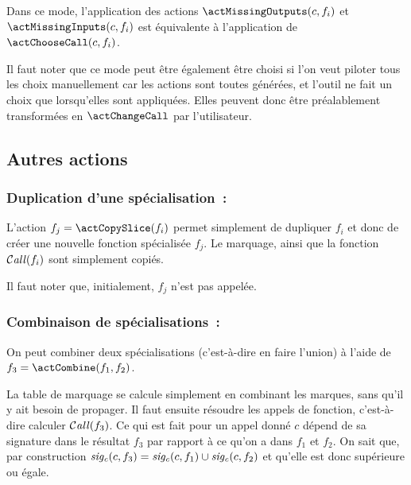 Dans ce mode, l'application des actions $\actMissingOutputs(c, f_i)$ et 
$\actMissingInputs(c, f_i)$ est équivalente à l'application
de $\actChooseCall(c, f_i)$.
\bb

Il faut noter que ce mode peut être également être choisi si l'on veut piloter
tous les choix manuellement car les actions sont toutes générées, et l'outil ne
fait un choix que lorsqu'elles sont appliquées. Elles peuvent donc être
préalablement transformées en $\actChangeCall$ par l'utilisateur.


\subsection{Autres actions}

\subsubsection{Duplication d'une spécialisation~: \actCopySlice}

L'action $f_j = \actCopySlice(f_i)$ permet simplement de dupliquer $f_i$
et donc de créer une nouvelle fonction spécialisée $f_j$.
Le marquage, ainsi que la fonction $\operatorname{\mathcal{C\mathit{all}}}(f_i)$ sont simplement copiés.

Il faut noter que, initialement, $f_j$ n'est pas appelée.

\subsubsection{Combinaison de spécialisations~: \actCombine}

On peut combiner deux spécialisations (c'est-à-dire en faire l'union) 
à l'aide de $f_3 = \actCombine(f_1, f_2)$.\bb

La table de marquage se
calcule simplement en combinant les marques, sans qu'il y ait besoin de
propager.  Il faut ensuite résoudre les appels de fonction, c'est-à-dire
calculer $\operatorname{\mathcal{C\mathit{all}}}(f_3)$.  Ce qui est fait
pour un appel donné $c$ dépend de sa signature dans le résultat $f_3$
par rapport à ce qu'on a dans $f_1$ et $f_2$.
On sait que, par construction 
$\mathit{sig_c}(c, f_3) = \mathit{sig_c}(c, f_1) \cup \mathit{sig_c}(c, f_2)$
et qu'elle est donc supérieure ou égale.

